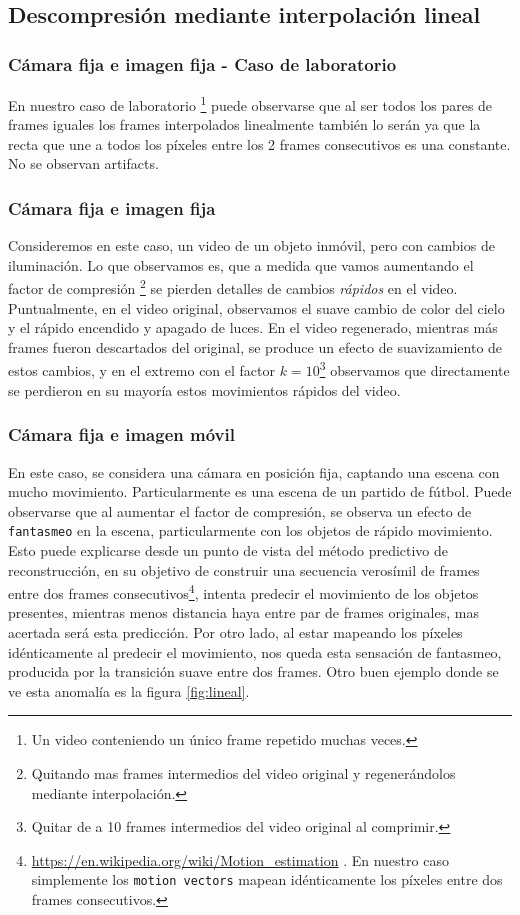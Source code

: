 \subsection{Descompresión mediante interpolación lineal}
\subsubsection{Cámara fija e imagen fija - Caso de laboratorio}
En nuestro caso de laboratorio \footnote{Un video conteniendo un único frame repetido muchas veces.} puede observarse que al ser todos los pares de frames iguales los frames interpolados linealmente también lo serán ya que la recta que une a todos los píxeles entre los 2 frames consecutivos es una constante. No se observan artifacts.

\subsubsection{Cámara fija e imagen fija}
Consideremos en este caso, un video de un objeto inmóvil, pero con cambios de iluminación. Lo que observamos es, que a medida que vamos aumentando el factor de compresión \footnote{Quitando mas frames intermedios del video original y regenerándolos mediante interpolación.} se pierden detalles de cambios \emph{rápidos} en el video. Puntualmente, en el video original, observamos el suave cambio de color del cielo y el rápido encendido y apagado de luces. En el video regenerado, mientras más frames fueron descartados del original, se produce un efecto de suavizamiento de estos cambios, y en el extremo con el factor $k = 10$\footnote{Quitar de a 10 frames intermedios del video original al comprimir.} observamos que directamente se perdieron en su mayoría estos movimientos rápidos del video.

\subsubsection{Cámara fija e imagen móvil}
En este caso, se considera una cámara en posición fija, captando una escena con mucho movimiento. Particularmente es una escena de un partido de fútbol. Puede observarse que al aumentar el factor de compresión, se observa un efecto de \texttt{fantasmeo} en la escena, particularmente con los objetos de rápido movimiento. Esto puede explicarse desde un punto de vista del método predictivo de reconstrucción, en su objetivo de construir una secuencia verosímil de frames entre dos frames consecutivos\footnote{\url{https://en.wikipedia.org/wiki/Motion_estimation} . En nuestro caso simplemente los \texttt{motion vectors} mapean idénticamente los píxeles entre dos frames consecutivos.}, intenta predecir el movimiento de los objetos presentes, mientras menos distancia haya entre par de frames originales, mas acertada será esta predicción. Por otro lado, al estar mapeando los píxeles idénticamente al predecir el movimiento, nos queda esta sensación de fantasmeo, producida por la transición suave entre dos frames. Otro buen ejemplo donde se ve esta anomalía es la figura \ref{fig:lineal}.

